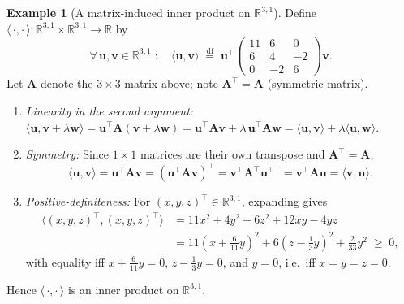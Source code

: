 \documentclass[11pt, a4paper, notitlepage]{report}
\theoremstyle{definition}
\newtheorem{example}[theorem]{Example}
\theoremstyle{remark}
\begin{document}
\begin{example}[A matrix-induced inner product on $\mathbb{R}^{3,1}$]
\label{ex:matrix-ip-R3}
Define $\langle\,\cdot,\cdot\,\rangle : \mathbb{R}^{3,1}\times\mathbb{R}^{3,1}\to\mathbb{R}$ by
\[
  \forall\,\mathbf{u},\mathbf{v}\in\mathbb{R}^{3,1}\;:\quad
  \langle\mathbf{u},\mathbf{v}\rangle
  \;\stackrel{\mathrm{df}}{=}\; \mathbf{u}^\top
  \begin{pmatrix} 11 & 6 & 0 \\ 6 & 4 & -2 \\ 0 & -2 & 6 \end{pmatrix}
  \mathbf{v}.
\]
Let $\mathbf{A}$ denote the $3\times 3$ matrix above; note $\mathbf{A}^\top = \mathbf{A}$
(symmetric matrix).

\begin{enumerate}
  \item \textit{Linearity in the second argument:}
        $\langle\mathbf{u},\mathbf{v}+\lambda\mathbf{w}\rangle
        = \mathbf{u}^\top\mathbf{A}(\mathbf{v}+\lambda\mathbf{w})
        = \mathbf{u}^\top\mathbf{A}\mathbf{v} + \lambda\,\mathbf{u}^\top\mathbf{A}\mathbf{w}
        = \langle\mathbf{u},\mathbf{v}\rangle + \lambda\langle\mathbf{u},\mathbf{w}\rangle$.
  \item \textit{Symmetry:} Since $1\times 1$ matrices are their own transpose and
        $\mathbf{A}^\top = \mathbf{A}$,
        \[
          \langle\mathbf{u},\mathbf{v}\rangle
          = \mathbf{u}^\top\mathbf{A}\mathbf{v}
          = (\mathbf{u}^\top\mathbf{A}\mathbf{v})^\top
          = \mathbf{v}^\top\mathbf{A}^\top\mathbf{u}^{\top\top}
          = \mathbf{v}^\top\mathbf{A}\mathbf{u}
          = \langle\mathbf{v},\mathbf{u}\rangle.
        \]
  \item \textit{Positive-definiteness:} For $(x,y,z)^\top \in \mathbb{R}^{3,1}$, expanding gives
        \begin{align*}
          \bigl\langle(x,y,z)^\top,(x,y,z)^\top\bigr\rangle
          &= 11x^2 + 4y^2 + 6z^2 + 12xy - 4yz \\
          &= 11\!\left(x + \tfrac{6}{11}y\right)^2
             + 6\!\left(z - \tfrac{1}{3}y\right)^2
             + \tfrac{2}{33}y^2 \;\geq\; 0,
        \end{align*}
        with equality iff $x + \tfrac{6}{11}y = 0$, $z - \tfrac{1}{3}y = 0$, and $y = 0$,
        i.e.\ iff $x = y = z = 0$.
\end{enumerate}
Hence $\langle\,\cdot,\cdot\,\rangle$ is an inner product on $\mathbb{R}^{3,1}$.
\end{example}
\end{document}
